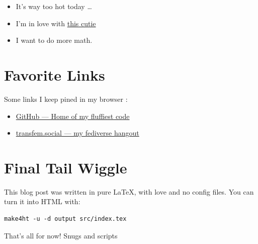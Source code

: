 \documentclass{article}
\begin{document}
\begin{itemize}
  \item It's way too hot today \ldots
  \item I'm in love with \href{https://github.com/Sigmanificient}{this cutie}
  \item I want to do more math.
\end{itemize}

\section*{Favorite Links}

Some links I keep pined in my browser :

\begin{itemize}
  \item \href{https://github.com/Jaggernaute}{GitHub — Home of my fluffiest code}
  \item \href{https://transfem.social/@jaggi}{transfem.social — my fediverse hangout}
\end{itemize}

\section*{Final Tail Wiggle}

This blog post was written in pure LaTeX, with love and no config files. You can turn it into HTML with:

\begin{verbatim}
make4ht -u -d output src/index.tex
\end{verbatim}

That’s all for now! Snugs and scripts
\end{document}
